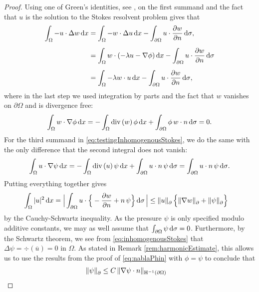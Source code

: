 \begin{proof}
  Using one of Green's identities, see \cite[Thm. 3, App. C.2]{evans}, on the first summand and the fact that $u$ is the solution to the Stokes resolvent problem gives that
  \begin{align*}
    \int_\Omega -u \cdot \Delta w \, {\operatorname{d}\!{x}}
    &= \int_\Omega -w \cdot \Delta u \, {\operatorname{d}\!{x}} - \int_{\partial\Omega} u \cdot \frac{\partial w}{\partial n} \, {\operatorname{d}\!{\sigma}}, \\[0.5em]
    &= \int_\Omega w \cdot ( -\lambda u - \nabla \phi) \, {\operatorname{d}\!{x}} - \int_{\partial\Omega} u \cdot \frac{\partial w}{\partial n} \, {\operatorname{d}\!{\sigma}} \\[0.5em]
    &= \int_\Omega -\lambda w \cdot u \, {\operatorname{d}\!{x}} - \int_{\partial\Omega} u \cdot \frac{\partial w}{\partial n} \, {\operatorname{d}\!{\sigma}}, 
  \end{align*}
  where in the last step we used integration by parts and the fact that $w$ vanishes on $\partial\Omega$ and is divergence free:
  \begin{align*}
    \int_\Omega w \cdot \nabla\phi \, {\operatorname{d}\!{x}} = -\int_\Omega \mathrm{div\,} (w) \, \phi \, {\operatorname{d}\!{x}} + \int_{\partial\Omega} \phi \, w \cdot n \, {\operatorname{d}\!{\sigma}} = 0.
  \end{align*}
  For the third summand in \eqref{eq:testingInhomogenousStokes}, we do the same with the only difference that the second integral does not vanish:
  \begin{align*}
    \int_\Omega u \cdot \nabla\psi \, {\operatorname{d}\!{x}} 
    = -\int_\Omega \mathrm{div\,} (u)\, \psi \, {\operatorname{d}\!{x}} + \int_{\partial\Omega} u \cdot n\, \psi \, {\operatorname{d}\!{\sigma}} 
    = \int_{\partial\Omega} u \cdot n  \,\psi \, {\operatorname{d}\!{\sigma}}.
  \end{align*}
  Putting everything together gives
  \begin{align}
    \int_\Omega |u|^2 \, {\operatorname{d}\!{x}} 
    &= \Big| \int_{\partial\Omega} u \cdot \Big\{ - \frac{\partial w}{\partial n} + n\, \psi \Big\} \, {\operatorname{d}\!{\sigma}}\, \Big|
    \leq \| u\|^{}_\partial \, \Big\{ \|\nabla w\|^{}_\partial + \|\psi\|^{}_\partial \Big\} \label{eq:u2estimate}
  \end{align}
  by the Cauchy-Schwartz inequality.
  As the pressure $\psi$ is only specified modulo additive constants, we may as well assume that $\int_{\partial\Omega} \psi \, {\operatorname{d}\!{\sigma}} = 0$.
  Furthermore, by the Schwartz theorem, we see from \eqref{eq:inhomogenousStokes} that $\Delta \psi = \div(\overline u) = 0$ in $\Omega$. 
  As stated in Remark \ref{rem:harmonicEstimate}, this allows us to use the results from the proof of \eqref{eq:nablaPhin} with $\phi = \psi$ to conclude that
  \begin{align}
      \|\psi\|^{}_\partial 
    &\leq C\, \| \nabla \psi \cdot n\|_{\HH^{-1}(\partial\Omega)} \nonumber

\end{align}
\end{proof}
